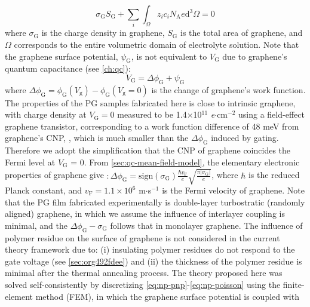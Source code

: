 \begin{equation}
  \label{eq:np-electro-neutral}
  \sigma_{\mathrm{G}} S_{\mathrm{G}} + \sum_{i} \int_{\Omega} z_{i} c_{i} N_{\mathrm{A}} e \mathrm{d}^{3} \Omega= 0
\end{equation}
where $\sigma_{\mathrm{G}}$ is the charge density in graphene,
$S_{\mathrm{G}}$ is the total area of graphene, and $\Omega$
corresponds to the entire volumetric domain of electrolyte
solution. Note that the graphene surface potential,
$\psi_{\mathrm{G}}$, is not equivalent to $V_{\mathrm{G}}$ due to graphene's quantum capacitance (see \autoref{ch:qc}):
\begin{equation}
  \label{eq:np-Vg}
  V_{\mathrm{G}} = \Delta \phi_{\mathrm{G}} + \psi_{\mathrm{G}}
\end{equation}
where
$\Delta \phi_{\mathrm{G}} = \phi_{\mathrm{G}}(V_{\mathrm{g}}) -
\phi_{\mathrm{G}}(V_{\mathrm{g}}=0)$ is the change of graphene’s work
function.
%
The properties of the PG samples fabricated here is close to
intrinsic graphene, with charge density at $V_{\mathrm{G}}=0$ measured
to be 1.4$\times$10$^{11}$ \textit{e}$\cdot$cm$^{-2}$ using a field-effect graphene transistor, corresponding
to a work function difference of 48 meV from graphene's CNP,
, which is much smaller than the $\Delta \phi_{\mathrm{G}}$
induced by gating.
%
Therefore we adopt the simplification that the
CNP of graphene coincides the Fermi level at
$V_{\mathrm{G}}$ = 0.
%
From \autoref{sec:qc-mean-field-model}, the elementary electronic properties of graphene
give \(:
  \Delta \phi_{\mathrm{G}} = \mathrm{sign}(\sigma_{\mathrm{G}}) \frac{\hbar v_{\mathrm{F}}}{e}
  \sqrt{\frac{\pi |\sigma_{\mathrm{G}}|}{e}}\),
where $\hbar$ is the reduced Planck constant, and
$v_{\mathrm{F}}=1.1\times10^{6}$ m$\cdot$s$^{-1}$ is the Fermi
velocity of graphene.
%
Note that the PG film fabricated experimentally is double-layer
turbostratic (randomly aligned) graphene, in which we assume the
influence of interlayer coupling is minimal, and the
$\Delta \phi_{\mathrm{G}} - \sigma_{\mathrm{G}}$ follows that in
monolayer graphene.
%
The influence of polymer residue on the surface of graphene is not
considered in the current theory framework due to: (i) insulating
polymer residues do not respond to the gate voltage (see
\autoref{sec:org492fdee}) and (ii) the thickness of the polymer
residue is minimal after the thermal annealing process.
%
The theory
proposed here was solved self-consistently by discretizing
\autoref{eq:np-pnp}-\autoref{eq:np-poisson} using the finite-element
method (FEM), in which the graphene surface potential is coupled with
